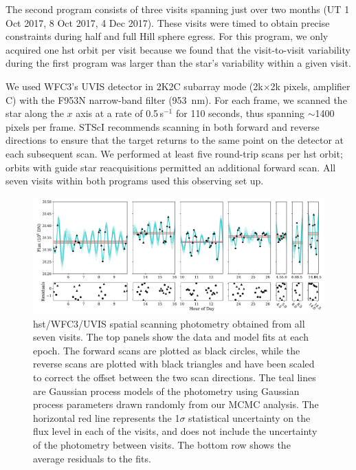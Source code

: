\documentclass[longauth]{aa} %
\begin{document}
The second program consists of three visits spanning just over two months (UT 1 Oct 2017, 8 Oct 2017, 4 Dec 2017).
%
These visits were timed to obtain precise constraints during half and full Hill sphere egress.
%
For this program, we only acquired one \ac{hst} orbit per visit because we found that the visit-to-visit variability during the first program was larger than the star's variability within a given visit.

We used WFC3's UVIS detector in 2K2C subarray mode (2k$\times$2k pixels, amplifier C) with the F953N narrow-band filter (953~nm).
%
For each frame, we scanned the star along the $x$ axis at a rate of 0.5\arcsec\,s$^{-1}$
for 110 seconds, thus spanning $\sim$1400 pixels per frame.
%
STScI recommends scanning in both forward and reverse directions to ensure that the target returns to the same point on the detector at each subsequent scan.
%
We performed at least five round-trip scans per \ac{hst} orbit; orbits with guide star reacquisitions permitted an additional forward scan.  All seven visits within both programs used this observing set up.

\begin{figure}
\includegraphics[width=1.0\textwidth]{hst_visitall-gpfit-maternperiodic.pdf}
\caption{\ac{hst}/WFC3/UVIS spatial scanning photometry obtained from all seven visits. The top panels show the data and model fits at each epoch. The forward scans are plotted as black circles, while the reverse scans are plotted with black triangles and have been scaled to correct the offset between the two scan directions. The teal lines are Gaussian process models of the photometry using Gaussian process parameters drawn randomly from our MCMC analysis. The horizontal red line represents the 1$\sigma$ statistical uncertainty on the flux level in each of the visits, and does not include the uncertainty of the photometry between visits. The bottom row shows the average residuals to the fits.
\label{fig:visits}}
\end{figure}
\end{document}
